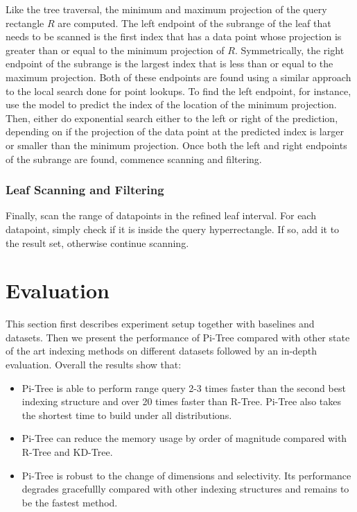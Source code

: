 \documentclass[sigconf,10pt]{acmart}
\begin{document}
Like the tree traversal, the minimum and maximum projection of the query 
rectangle $R$ are computed. 
The left endpoint of the subrange of the leaf that needs to be scanned
is the first index that has a data point whose projection is greater than or equal to the minimum
projection of $R$. Symmetrically, the right endpoint of the subrange is the 
largest index that is less than or equal to the maximum projection.
Both of these endpoints are found using a similar approach to the local
search done for point lookups. To find the left endpoint, for instance,
use the model to predict the index of the location of the minimum projection.
Then, either do exponential search either to the left or right of the prediction,
depending on if the projection of the data point at the predicted index is
larger or smaller than the minimum projection. Once both the left
and right endpoints of the subrange are found, commence scanning and filtering.

\subsubsection{Leaf Scanning and Filtering}

Finally, scan the range of datapoints in the refined leaf interval.
For each datapoint, simply check if it is inside the query hyperrectangle.
If so, add it to the result set, otherwise continue scanning.

\section{Evaluation}

This section first describes experiment setup together with baselines and datasets. 
Then we present the performance of Pi-Tree compared with other state of the art 
indexing methods on different datasets followed by an in-depth evaluation. 
Overall the results show that:
\begin{itemize}
    \item Pi-Tree is able to perform range query 2-3 times faster than the second
    best indexing structure and over 20 times faster than R-Tree. Pi-Tree also takes
    the shortest time to build under all distributions.
    \item Pi-Tree can reduce the memory usage by order of magnitude compared with
    R-Tree and KD-Tree.
    \item Pi-Tree is robust to the change of dimensions and selectivity. Its performance
    degrades gracefullly compared with other indexing structures and remains to be
    the fastest method.
\end{itemize}
\end{document}
